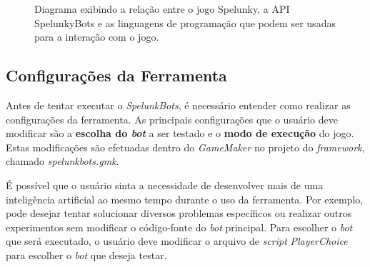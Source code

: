 \begin{figure}[htb!]
\centering
{}
\caption {\label{fig:spelunkbots-usage-diagram}Diagrama exibindo a relação
entre o jogo Spelunky, a API SpelunkyBots e as linguagens de programação que
podem ser usadas para a interação com o jogo.}
\end{figure}


\subsection{Configurações da Ferramenta}
Antes de tentar executar o \textit{SpelunkBots}, é necessário entender como
realizar as configurações da ferramenta. As principais configurações que o
usuário deve modificar são a \textbf{escolha do \textit{bot}} a ser testado e o
\textbf{modo de execução} do jogo. Estas modificações são efetuadas dentro do
\textit{GameMaker} no projeto do \textit{framework}, chamado
\textit{spelunkbots.gmk}.

É possível que o usuário sinta a necessidade de desenvolver mais de uma
inteligência artificial ao mesmo tempo durante o uso da ferramenta.  Por
exemplo, pode desejar tentar solucionar diversos problemas específicos ou
realizar outros experimentos sem modificar o código-fonte do \textit{bot}
principal.  Para escolher o \textit{bot} que será executado, o usuário deve
modificar o arquivo de \textit{script} \textit{PlayerChoice} para escolher o
\textit{bot} que deseja testar.

